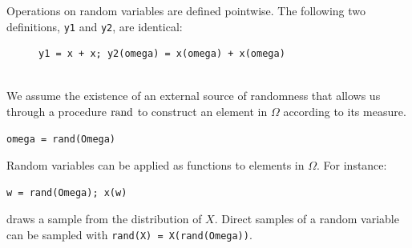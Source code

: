 Operations on random variables are defined pointwise.  The following two definitions, \texttt{y1} and \texttt{y2}, are identical:
\begin{figure}[h]
	\centering
	\begin{BVerbatim}
y1 = x + x; y2(omega) = x(omega) + x(omega)
\end{BVerbatim}
\end{figure}\\
We assume the existence of an external source of randomness that allows us through a procedure $\operatorname{rand}$ to construct an element in $\Omega$ according to its measure.
\begin{center}
\begin{minipage}{5cm}
\begin{Verbatim}[fontsize=\small]
omega = rand(Omega)
\end{Verbatim}
\end{minipage}
\end{center}
Random variables can be applied as functions to elements in $\Omega$. For instance:
\begin{center}
\begin{minipage}{5cm}
\begin{Verbatim}[fontsize=\small]
w = rand(Omega); x(w)
\end{Verbatim}
\end{minipage}
\end{center}
draws a sample from the distribution of $X$. Direct samples of a random variable can be sampled with \texttt{rand(X) = X(rand(Omega))}. 

